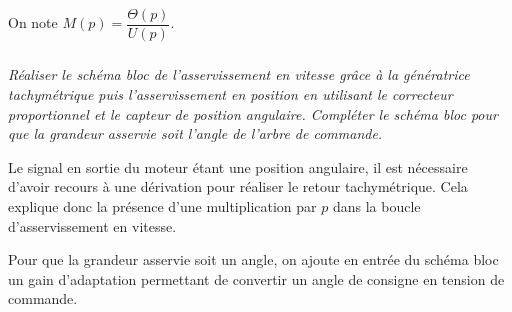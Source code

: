 \documentclass[10pt,fleqn]{article} %
\begin{document}
\begin{multicols}{2}
\begin{corrige}
\end{corrige}

On note $M(p)=\dfrac{\Theta(p)}{U(p)}$.

\subparagraph{}
\textit{Réaliser le schéma bloc de l'asservissement en vitesse grâce à la génératrice tachymétrique puis l'asservissement en position en utilisant le correcteur proportionnel et le capteur de position angulaire. Compléter le schéma bloc pour que la grandeur asservie soit l'angle de l'arbre de commande.}
\begin{corrige}
Le signal en sortie du moteur étant une position angulaire, il est nécessaire d'avoir recours à une dérivation pour réaliser le retour tachymétrique. Cela explique donc la présence d'une multiplication par $p$ dans la boucle d'asservissement en vitesse.

Pour que la grandeur asservie soit un angle, on ajoute en entrée du schéma bloc un gain d'adaptation permettant de convertir un angle de consigne en tension de commande.

\footnotesize{
\begin{center}
\end{center}}

\end{corrige}



\end{multicols}
\end{document}
